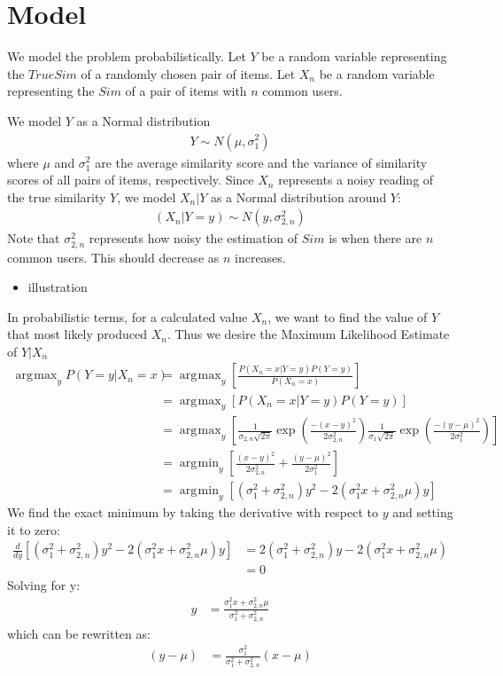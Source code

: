 \documentclass[10pt]{article}
\DeclareMathOperator*{\argmax}{arg\!\max}
\DeclareMathOperator*{\argmin}{arg\!\min}
\begin{document}
\section*{Model}
We model the problem probabilistically. Let $Y$ be a random variable
representing the $TrueSim$ of a randomly chosen pair of items. Let $X_n$ be a
random variable representing the $Sim$ of a pair of items with $n$ common users.

We model $Y$ as a Normal distribution 
\begin{align}
Y \sim N(\mu, \sigma_{1}^2)
\end{align}
where $\mu$ and $\sigma_{1}^2$ are the average similarity score and the variance of similarity scores
of all pairs of items, respectively. Since $X_n$ represents a noisy reading of
the true similarity $Y$, we model $X_n | Y$ as a Normal distribution around $Y$:
\begin{align}
(X_n | Y=y) \sim N(y, \sigma_{2, n}^2)
\end{align}
Note that $\sigma_{2, n}^2$ represents how noisy the estimation of $Sim$ is
when there are $n$ common users. This should decrease as $n$ increases.

\begin{itemize}
    \item illustration
\end{itemize}

In probabilistic terms, for a calculated value $X_n$, we want to find the value 
of $Y$ that most likely produced $X_n$. Thus we desire the Maximum Likelihood
Estimate of $Y | X_n$
\begin{align}
\argmax_yP(Y=y|X_n=x) &= \argmax_y\left[\frac{P(X_n=x |
Y=y)P(Y=y)}{P(X_n=x)}\right]
\\&= \argmax_y\left[P(X_n=x|Y=y)P(Y=y)\right]
\\&= 
\argmax_y\left[\frac{1}{\sigma_{2,n}\sqrt{2\pi}}\exp{\left(\frac{-(x-y)^2}{2\sigma_{2,n}^2}\right)}
\frac{1}{\sigma_{1}\sqrt{2\pi}}\exp{\left(\frac{-(y-\mu)^2}{2\sigma_{1}^2}\right)}\right]
\\&= \argmin_y\left[\frac{(x-y)^2}{2\sigma_{2,n}^2} +
\frac{(y-\mu)^2}{2\sigma_{1}^2}\right]
\\&= \argmin_y\left[\left(\sigma_{1}^2+\sigma_{2,n}^2\right)y^2 - 
2\left(\sigma_{1}^2x+\sigma_{2,n}^2\mu\right)y\right]
\end{align}
We find the exact minimum by taking the derivative with respect to $y$ and
setting it to zero:
\begin{align}
\frac{d}{dy}\left[\left(\sigma_{1}^2+\sigma_{2,n}^2\right)y^2 - 
2\left(\sigma_{1}^2x+\sigma_{2,n}^2\mu\right)y\right]
&= 2\left(\sigma_{1}^2+\sigma_{2,n}^2\right)y - 
2\left(\sigma_{1}^2x+\sigma_{2,n}^2\mu\right) 
\\&= 0
\end{align}
Solving for y:
\begin{align}
y &= \frac{\sigma_{1}^2x+\sigma_{2,n}^2\mu}{\sigma_{1}^2+\sigma_{2,n}^2}
\end{align}
which can be rewritten as:
\begin{align}
\left(y - \mu\right) &= \frac{\sigma_{1}^2}{\sigma_{1}^2+\sigma_{2,n}^2}\left(x-\mu\right)
\end{align}
\end{document}
